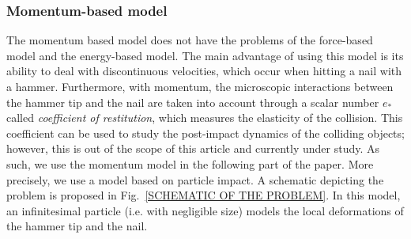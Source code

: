 \documentclass[conference]{IEEEtran}
\begin{document}
\subsubsection{Momentum-based model}
\noindent
The momentum based model does not have the problems of the force-based model and the energy-based model. 
The main advantage of using this model is its ability to deal with discontinuous velocities, which occur when hitting a nail with a hammer. 
Furthermore, with momentum, the microscopic interactions between the hammer tip and the nail are taken into account through a scalar number $e_*$ called \textit{coefficient of restitution}, which measures the elasticity of the collision.
This coefficient can be used to study the post-impact dynamics of the colliding objects; however, this is out of the scope of this article and currently under study.
As such, we use the momentum model in the following part of the paper. 
More precisely, we use a model based on particle impact. A schematic depicting the problem is proposed in Fig.~\ref{SCHEMATIC OF THE PROBLEM}. 
In this model, an infinitesimal particle (i.e. with negligible size) models the local deformations of the hammer tip and the nail.


%     
\end{document}
